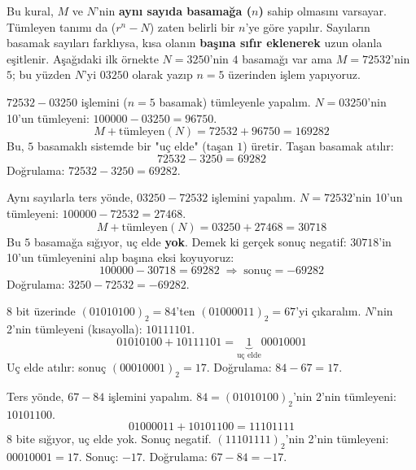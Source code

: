 \begin{bilginot}
Bu kural, $M$ ve $N$'nin \textbf{aynı sayıda basamağa ($n$)} sahip olmasını varsayar. Tümleyen
tanımı da ($r^n-N$) zaten belirli bir $n$'ye göre yapılır. Sayıların basamak sayıları farklıysa,
kısa olanın \textbf{başına sıfır eklenerek} uzun olanla eşitlenir. Aşağıdaki ilk örnekte
$N=3250$'nin $4$ basamağı var ama $M=72532$'nin $5$; bu yüzden $N$'yi $03250$ olarak yazıp
$n=5$ üzerinden işlem yapıyoruz.
\end{bilginot}

\begin{ornek}
$72532-03250$ işlemini ($n=5$ basamak) tümleyenle yapalım. $N=03250$'nin 10'un tümleyeni:
$100000-03250=96750$.
\[
M+\text{tümleyen}(N) = 72532+96750 = 169282
\]
Bu, $5$ basamaklı sistemde bir "uç elde" (taşan $1$) üretir. Taşan basamak atılır:
\[
72532-3250 = 69282
\]
Doğrulama: $72532-3250=69282$. \checkmark
\end{ornek}

\begin{ornek}
Aynı sayılarla ters yönde, $03250-72532$ işlemini yapalım. $N=72532$'nin 10'un tümleyeni:
$100000-72532=27468$.
\[
M+\text{tümleyen}(N) = 03250+27468 = 30718
\]
Bu $5$ basamağa sığıyor, uç elde \textbf{yok}. Demek ki gerçek sonuç negatif: $30718$'in
10'un tümleyenini alıp başına eksi koyuyoruz:
\[
100000-30718=69282 \;\Rightarrow\; \text{sonuç} = -69282
\]
Doğrulama: $3250-72532=-69282$. \checkmark
\end{ornek}

\begin{ornek}
$8$ bit üzerinde $(01010100)_2{=}84$'ten $(01000011)_2{=}67$'yi çıkaralım. $N$'nin 2'nin
tümleyeni (kısayolla): $10111101$.
\[
01010100+10111101 = \underbrace{1}_{\text{uç elde}}00010001
\]
Uç elde atılır: sonuç $(00010001)_2=17$. Doğrulama: $84-67=17$. \checkmark
\end{ornek}

\begin{ornek}
Ters yönde, $67-84$ işlemini yapalım. $84=(01010100)_2$'nin 2'nin tümleyeni: $10101100$.
\[
01000011+10101100 = 11101111
\]
$8$ bite sığıyor, uç elde yok. Sonuç negatif. $(11101111)_2$'nin 2'nin tümleyeni:
$00010001=17$. Sonuç: $-17$. Doğrulama: $67-84=-17$. \checkmark
\end{ornek}

